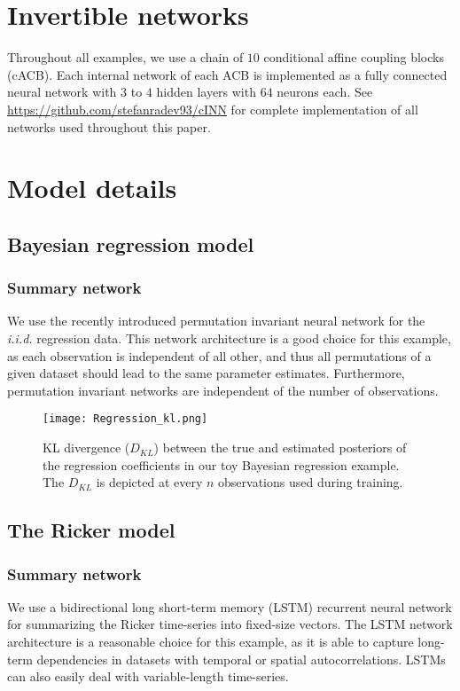 \documentclass[9pt,twoside,lineno]{pnas-new}
\begin{document}
\section*{Invertible networks}
Throughout all examples, we use a chain of $10$ conditional affine coupling blocks (cACB). Each internal network of each ACB is implemented as a fully connected neural network with $3$ to $4$ hidden layers with $64$ neurons each. See \href{https://github.com/stefanradev93/cINN}{https://github.com/stefanradev93/cINN} for complete implementation of all networks used throughout this paper.

\section*{Model details}

\subsection*{Bayesian regression model}

\subsubsection*{Summary network}
We use the recently introduced permutation invariant neural network \cite{bloem2019probabilistic} for the \textit{i.i.d.} regression data. This network architecture is a good choice for this example, as each observation is independent of all other, and thus all permutations of a given dataset should lead to the same parameter estimates. Furthermore, permutation invariant networks are independent of the number of observations.

\begin{figure}
\centering
\texttt{[image: Regression\_kl.png]}
\caption{KL divergence ($D_{KL}$) between the true and estimated posteriors of the regression coefficients in our toy Bayesian regression example. The $D_{KL}$ is depicted at every $n$ observations used during training.} 
\end{figure}

\subsection*{The Ricker model}

\subsubsection*{Summary network}
We use a bidirectional long short-term memory (LSTM) recurrent neural network \cite{gers1999learning} for summarizing the Ricker time-series into fixed-size vectors. The LSTM network architecture is a reasonable choice for this example, as it is able to capture long-term dependencies in datasets with temporal or spatial autocorrelations. LSTMs can also easily deal with variable-length time-series.
\end{document}
